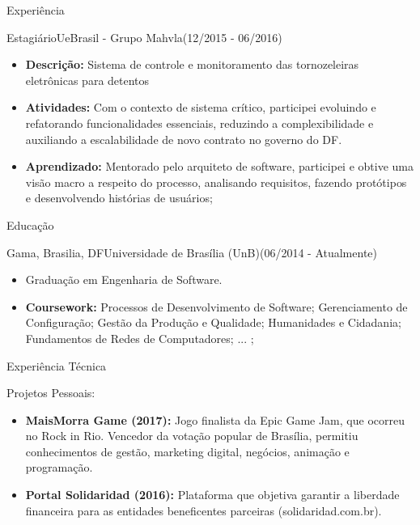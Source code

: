 \documentclass[]{fraguilarcv}
\begin{document}
\begin{cvsection}{Experiência}
		\begin{cvsubsection}{Estagiário}{UeBrasil - Grupo Mahvla}{(12/2015 - 06/2016)}
			\begin{itemize}
				\item \textbf{Descrição:} Sistema de controle e monitoramento das tornozeleiras eletrônicas para detentos
	      		\item \textbf{Atividades:} Com o contexto de sistema crítico, participei evoluindo e refatorando funcionalidades essenciais, reduzindo a complexibilidade e auxiliando a escalabilidade de novo contrato no governo do DF.
                \item \textbf{Aprendizado:} Mentorado pelo arquiteto de software, participei e obtive uma visão macro a respeito do processo, analisando requisitos, fazendo protótipos e desenvolvendo histórias de usuários;
			\end{itemize}
		\end{cvsubsection}

	\begin{cvsection}{Educação}
		\begin{cvsubsection}{Gama, Brasilia, DF}{Universidade de Brasília (UnB)}{(06/2014 - Atualmente)}
			\begin{itemize}
				\item Graduação em Engenharia de Software.
				\item \textbf{Coursework:} {Processos de Desenvolvimento de Software; Gerenciamento de Configuração; Gestão da Produção e Qualidade; Humanidades e Cidadania; Fundamentos de Redes de Computadores; ... ;}
			\end{itemize}
		\end{cvsubsection}
	\end{cvsection}

	\begin{cvsection}{Experiência Técnica}
		\begin{cvsubsection}{Projetos Pessoais:}{}{}
			\begin{itemize}
	    	\item \textbf{MaisMorra Game (2017):} Jogo finalista da Epic Game Jam, que ocorreu no Rock in Rio. Vencedor da votação popular de Brasília, permitiu conhecimentos de gestão, marketing digital, negócios, animação e programação.
	      	\item \textbf{Portal Solidaridad (2016):} Plataforma que objetiva garantir a liberdade financeira para as entidades beneficentes parceiras (solidaridad.com.br).
			\end{itemize}
		\end{cvsubsection}
	\end{cvsection}
\end{cvsection}
\end{document}
